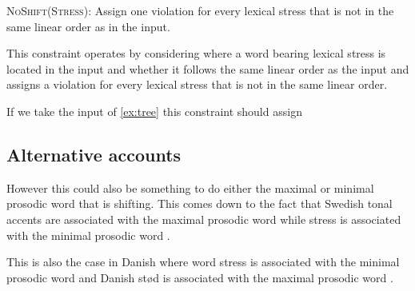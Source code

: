 \documentclass[12pt, letterpaper]{article}
\begin{document}
\ex \textsc{NoShift(Stress)}:
Assign one violation for every lexical stress that is not in the same linear order as in the input.

\ex This constraint operates by considering where a word bearing lexical stress is located in the input and whether it follows the same linear order as the input and assigns a violation for every lexical stress that is not in the same linear order.

\ex If we take the input of \ref{ex:tree} this constraint should assign 


\subsection{Alternative accounts} \label{sec:MaximalW}

\ex However this could also be something to do either the maximal or minimal prosodic word that is shifting. This comes down to the fact that Swedish tonal accents are associated with the maximal prosodic word while stress is associated with the minimal prosodic word \citep{myrbergProsodicWordSwedish2013}. 

\ex This is also the case in Danish where word stress is associated with the minimal prosodic word and Danish stød is associated with the maximal prosodic word \citep[see discussion of stød placement in][]{kalivodaProsodicRecursionPseudocyclicity2018}.

\z 


\printbibliography[heading=bibintoc]
\end{document}
